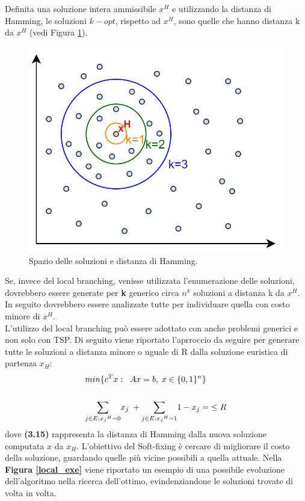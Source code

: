 Definita una soluzione intera ammissibile $x^H$ e utilizzando la distanza di Hamming, le soluzioni $k-opt$, rispetto ad $x^H$, sono quelle che hanno distanza k da $x^H$ (vedi Figura \ref{opt}).\\
\begin{figure}[h] 
\begin{center} 
  \includegraphics[scale=0.38]{Images/opt}
  \caption{\footnotesize{Spazio delle soluzioni e distanza di Hamming.}} \label{opt} 
\end{center} 
\end{figure}
Se, invece del local branching, venisse utilizzata l'enumerazione delle soluzioni, dovrebbero essere generate per \textbf{k} generico circa $n^k$ soluzioni a distanza k da $x^H$. In seguito dovrebbero essere analizzate tutte per individuare quella con costo minore di $x^H$.\\
L'utilizzo del local branching può essere adottato con anche problemi generici e non solo con TSP. Di seguito viene riportato l'aprroccio da seguire per generare tutte le soluzioni a distanza minore o uguale di R dalla soluzione euristica di partenza $x_H$:
\begin{align}
& min \{ c^T x:\;\;Ax=b,\;x\in\{0,1\}^n\} \\ \notag \\
& \underset{j\in E:{x_j}^H=0}\sum{x_j}\;+ \underset{j\in E:{x_j}^H=1}\sum{1-x_j}=\; \leq R
\end{align}
dove \textbf{(3.15)} rappresenta la distanza di Hamming dalla nuova soluzione computata $x$ da $x_H$. L'obiettivo del Soft-fixing è cercare di migliorare il costo della soluzione, guardando quelle più vicine possibili a quella attuale. Nella \textbf{Figura \ref{local_exe}} viene riportato un esempio di una possibile evoluzione dell'algoritmo nella ricerca dell'ottimo, evindenziandone le soluzioni trovate di volta in volta.
